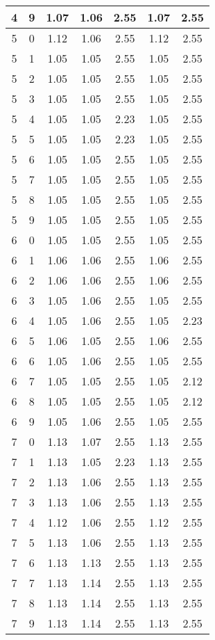 \begin{longtable}{|c|c||c||c|c||c|c|}
	4 & 9 & 1.07 & 1.06 & 2.55 & 1.07 & 2.55 \\ \hline
	5 & 0 & 1.12 & 1.06 & 2.55 & 1.12 & 2.55 \\ \hline
	5 & 1 & 1.05 & 1.05 & 2.55 & 1.05 & 2.55 \\ \hline
	5 & 2 & 1.05 & 1.05 & 2.55 & 1.05 & 2.55 \\ \hline
	5 & 3 & 1.05 & 1.05 & 2.55 & 1.05 & 2.55 \\ \hline
	5 & 4 & 1.05 & 1.05 & 2.23 & 1.05 & 2.55 \\ \hline
	5 & 5 & 1.05 & 1.05 & 2.23 & 1.05 & 2.55 \\ \hline
	5 & 6 & 1.05 & 1.05 & 2.55 & 1.05 & 2.55 \\ \hline
	5 & 7 & 1.05 & 1.05 & 2.55 & 1.05 & 2.55 \\ \hline
	5 & 8 & 1.05 & 1.05 & 2.55 & 1.05 & 2.55 \\ \hline
	5 & 9 & 1.05 & 1.05 & 2.55 & 1.05 & 2.55 \\ \hline
	6 & 0 & 1.05 & 1.05 & 2.55 & 1.05 & 2.55 \\ \hline
	6 & 1 & 1.06 & 1.06 & 2.55 & 1.06 & 2.55 \\ \hline
	6 & 2 & 1.06 & 1.06 & 2.55 & 1.06 & 2.55 \\ \hline
	6 & 3 & 1.05 & 1.06 & 2.55 & 1.05 & 2.55 \\ \hline
	6 & 4 & 1.05 & 1.06 & 2.55 & 1.05 & 2.23 \\ \hline
	6 & 5 & 1.06 & 1.05 & 2.55 & 1.06 & 2.55 \\ \hline
	6 & 6 & 1.05 & 1.06 & 2.55 & 1.05 & 2.55 \\ \hline
	6 & 7 & 1.05 & 1.05 & 2.55 & 1.05 & 2.12 \\ \hline
	6 & 8 & 1.05 & 1.05 & 2.55 & 1.05 & 2.12 \\ \hline
	6 & 9 & 1.05 & 1.06 & 2.55 & 1.05 & 2.55 \\ \hline
	7 & 0 & 1.13 & 1.07 & 2.55 & 1.13 & 2.55 \\ \hline
	7 & 1 & 1.13 & 1.05 & 2.23 & 1.13 & 2.55 \\ \hline
	7 & 2 & 1.13 & 1.06 & 2.55 & 1.13 & 2.55 \\ \hline
	7 & 3 & 1.13 & 1.06 & 2.55 & 1.13 & 2.55 \\ \hline
	7 & 4 & 1.12 & 1.06 & 2.55 & 1.12 & 2.55 \\ \hline
	7 & 5 & 1.13 & 1.06 & 2.55 & 1.13 & 2.55 \\ \hline
	7 & 6 & 1.13 & 1.13 & 2.55 & 1.13 & 2.55 \\ \hline
	7 & 7 & 1.13 & 1.14 & 2.55 & 1.13 & 2.55 \\ \hline
	7 & 8 & 1.13 & 1.14 & 2.55 & 1.13 & 2.55 \\ \hline
	7 & 9 & 1.13 & 1.14 & 2.55 & 1.13 & 2.55 \\ \hline
\end{longtable}
